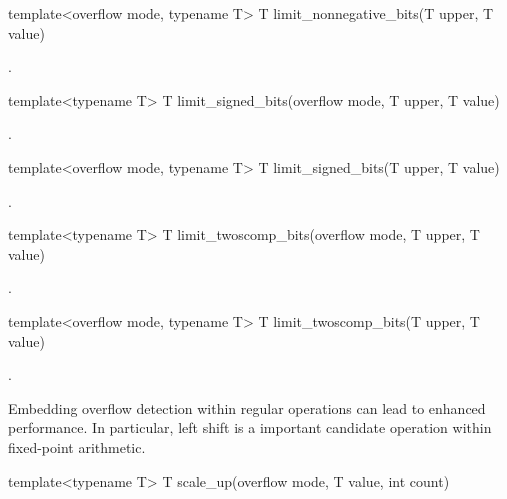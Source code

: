 \begin{addedblock}
\begin{itemdecl}
template<overflow mode, typename T> T limit_nonnegative_bits(T upper, T value)		
\end{itemdecl}

\begin{itemdescr}
\returns {}.	
\end{itemdescr}

\begin{itemdecl}
template<typename T> T limit_signed_bits(overflow mode, T upper, T value)		
\end{itemdecl}

\begin{itemdescr}
\returns {}.	
\end{itemdescr}

\begin{itemdecl}
template<overflow mode, typename T> T limit_signed_bits(T upper, T value)		
\end{itemdecl}

\begin{itemdescr}
\returns {}.
\end{itemdescr}

\begin{itemdecl}
template<typename T> T limit_twoscomp_bits(overflow mode, T upper, T value)		
\end{itemdecl}

\begin{itemdescr}
\returns {}.	
\end{itemdescr}

\begin{itemdecl}
template<overflow mode, typename T> T limit_twoscomp_bits(T upper, T value)		
\end{itemdecl}

\begin{itemdescr}
\returns {}.	
\end{itemdescr}

Embedding overflow detection within regular operations can lead to enhanced performance. In particular, left shift is a important candidate operation within fixed-point arithmetic.

\begin{itemdecl}
template<typename T> T scale_up(overflow mode, T value, int count)		
\end{itemdecl}


\end{addedblock}

